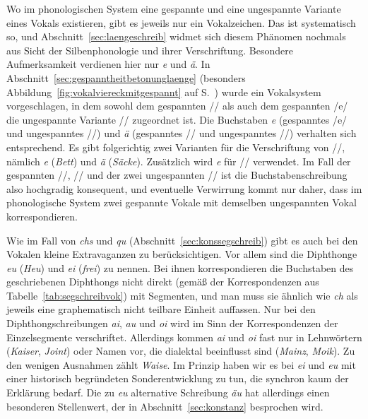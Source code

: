 Wo im phonologischen System eine gespannte und eine ungespannte Variante eines Vokals existieren, gibt es jeweils nur ein Vokalzeichen.
Das ist systematisch so, und Abschnitt~\ref{sec:laengeschreib} widmet sich diesem Phänomen nochmals aus Sicht der Silbenphonologie und ihrer Verschriftung.
Besondere Aufmerksamkeit verdienen hier nur \textit{e} und \textit{ä}.
In Abschnitt~\ref{sec:gespanntheitbetonunglaenge} (besonders Abbildung~\ref{fig:vokalviereckmitgespannt} auf S.~\pageref{fig:vokalviereckmitgespannt}) wurde ein Vokalsystem vorgeschlagen, in dem sowohl dem gespannten // als auch dem gespannten /e/ die ungespannte Variante // zugeordnet ist.
Die Buchstaben \textit{e} (gespanntes /e/ und ungespanntes //) und \textit{ä} (gespanntes // und ungespanntes //) verhalten sich entsprechend.
Es gibt folgerichtig zwei Varianten für die Verschriftung von //, nämlich \textit{e} (\textit{Bett}) und \textit{ä} (\textit{Säcke}).
Zusätzlich wird \textit{e} für // verwendet.
Im Fall der gespannten //, // und der zwei ungespannten // ist die Buchstabenschreibung also hochgradig konsequent, und eventuelle Verwirrung kommt nur daher, dass im phonologische System zwei gespannte Vokale mit demselben ungespannten Vokal korrespondieren.

\Enl

Wie im Fall von \textit{chs} und \textit{qu} (Abschnitt~\ref{sec:konssegschreib}) gibt es auch bei den Vokalen kleine Extravaganzen zu berücksichtigen.
Vor allem sind die Diphthonge \textit{eu} (\textit{Heu}) und \textit{ei} (\textit{frei}) zu nennen.
Bei ihnen korrespondieren die Buchstaben des geschriebenen Diphthongs nicht direkt (gemäß der Korrespondenzen aus Tabelle~\ref{tab:segschreibvok}) mit Segmenten, und man muss sie ähnlich wie \textit{ch} als jeweils eine graphematisch nicht teilbare Einheit auffassen.
Nur bei den Diphthongschreibungen \textit{ai}, \textit{au} und \textit{oi} wird im Sinn der Korrespondenzen der Einzelsegmente verschriftet.
Allerdings kommen \textit{ai} und \textit{oi} fast nur in Lehnwörtern (\textit{Kaiser}, \textit{Joint}) oder Namen vor, die dialektal beeinflusst sind (\textit{Mainz}, \textit{Moik}).
Zu den wenigen Ausnahmen zählt \textit{Waise}.
Im Prinzip haben wir es bei \textit{ei} und \textit{eu} mit einer historisch begründeten Sonderentwicklung zu tun, die synchron kaum der Erklärung bedarf.
Die zu \textit{eu} alternative Schreibung \textit{äu} hat allerdings einen besonderen Stellenwert, der in Abschnitt~\ref{sec:konstanz} besprochen wird.

